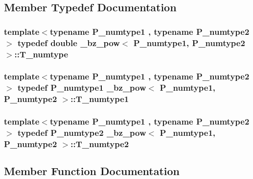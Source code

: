 \subsection{Member Typedef Documentation}
\hypertarget{class__bz__pow_add0a0fcd3be75612d7ef367722107a97}{}
\subsubsection[{T\+\_\+numtype}]{\setlength{\rightskip}{0pt plus 5cm}template$<$typename P\+\_\+numtype1 , typename P\+\_\+numtype2 $>$ typedef double {\bf \+\_\+bz\+\_\+pow}$<$ P\+\_\+numtype1, P\+\_\+numtype2 $>$\+::{\bf T\+\_\+numtype}}\label{class__bz__pow_add0a0fcd3be75612d7ef367722107a97}
\hypertarget{class__bz__pow_a64db2ba97103d451262eafba10ca79cd}{}
\subsubsection[{T\+\_\+numtype1}]{\setlength{\rightskip}{0pt plus 5cm}template$<$typename P\+\_\+numtype1 , typename P\+\_\+numtype2 $>$ typedef P\+\_\+numtype1 {\bf \+\_\+bz\+\_\+pow}$<$ P\+\_\+numtype1, P\+\_\+numtype2 $>$\+::{\bf T\+\_\+numtype1}}\label{class__bz__pow_a64db2ba97103d451262eafba10ca79cd}
\hypertarget{class__bz__pow_a679e644bd021a534bb4ae4aba9c59d99}{}
\subsubsection[{T\+\_\+numtype2}]{\setlength{\rightskip}{0pt plus 5cm}template$<$typename P\+\_\+numtype1 , typename P\+\_\+numtype2 $>$ typedef P\+\_\+numtype2 {\bf \+\_\+bz\+\_\+pow}$<$ P\+\_\+numtype1, P\+\_\+numtype2 $>$\+::{\bf T\+\_\+numtype2}}\label{class__bz__pow_a679e644bd021a534bb4ae4aba9c59d99}


\subsection{Member Function Documentation}
\hypertarget{class__bz__pow_a46094da92727279b3d61fe15b4c5cb78}{}
